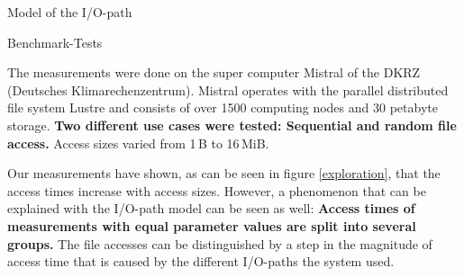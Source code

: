 \documentclass[final]{beamer}
\newlength{\onecolwid}
\begin{document}
\begin{frame}[t]
\begin{columns}[t]
\begin{column}{\onecolwid}
\begin{block}{Model of the I/O-path}
	
	
\end{block}

\begin{block}{Benchmark-Tests}
	
	The measurements were done on the super computer Mistral of the DKRZ (Deutsches Klimarechenzentrum).
	Mistral operates with the parallel distributed file system Lustre and consists of over 1500 computing nodes and 30 petabyte storage.
	\textbf{Two different use cases were tested: Sequential and random file access.}
	Access sizes varied from 1\,B to 16\,MiB.\medskip
	
	Our measurements have shown, as can be seen in figure \ref{exploration}, that the access times increase with access sizes.
	However, a phenomenon that can be explained with the I/O-path model can be seen as well: \textbf{Access times of measurements with equal parameter values are split into several groups.}
	The file accesses can be distinguished by a step in the magnitude of access time that is caused by the different I/O-paths the system used.
		

\end{block}
\end{column}
\end{columns}
\end{frame}
\end{document}

